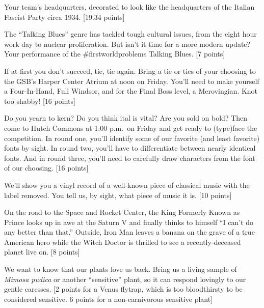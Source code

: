 \documentclass{book}
\begin{document}
\begin{list}{}{}
\item  Your team's headquarters, decorated to look like the headquarters of the Italian Fascist Party circa 1934. [19.34 points]

\item The ``Talking Blues'' genre has tackled tough cultural issues, from the eight hour work day to nuclear proliferation. But isn't it time for a more modern update? Your performance of the \#firstworldproblems Talking Blues. [7 points]

\item If at first you don't succeed, tie, tie again. Bring a tie or ties of your choosing to the GSB's Harper Center Atrium at noon on Friday. You'll need to make yourself a Four-In-Hand, Full Windsor, and for the Final Boss level, a Merovingian. Knot too shabby! [16 points]

\item Do you yearn to kern? Do you think ital is vital? Are you sold on bold? Then come to Hutch Commons at 1:00 p.m.\ on Friday and get ready to (type)face the competition. In round one, you'll identify some of our favorite (and least favorite) fonts by sight. In round two, you'll have to differentiate between nearly identical fonts. And in round three, you'll need to carefully draw characters from the font of our choosing. [16 points]

\item We'll show you a vinyl record of a well-known piece of classical music with the label removed. You tell us, by sight, what piece of music it is. [10 points]

\item On the road to the Space and Rocket Center, the King Formerly Known as Prince looks up in awe at the Saturn V and finally thinks to himself ``I can't do any better than that.''  Outside, Iron Man leaves a banana on the grave of a true American hero while the Witch Doctor is thrilled to see a recently-deceased planet live on. [8 points]  



\newpage



\item We want to know that our plants love us back. Bring us a living sample of \emph{Mimosa pudica} or another ``sensitive'' plant, so it can respond lovingly to our gentle caresses. [2 points for a Venus flytrap, which is too bloodthirsty to be considered sensitive. 6 points for a non-carnivorous sensitive plant]


\end{list}
\end{document}
